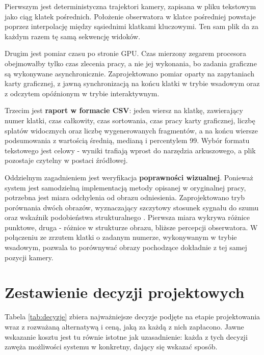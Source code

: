 Pierwszym jest deterministyczna trajektori kamery, zapisana w pliku tekstowym jako ciąg klatek pośrednich. Położenie obserwatora w klatce pośredniej powstaje poprzez interpolację między sąsiednimi klatkami kluczowymi. Ten sam plik da za każdym razem tę samą sekwencję widoków.

Drugim jest pomiar czasu po stronie GPU. Czas mierzony zegarem procesora obejmowałby tylko czas zlecenia pracy, a nie jej wykonania, bo zadania graficzne są wykonywane asynchronicznie. Zaprojektowano pomiar oparty na zapytaniach karty graficznej, z jawną synchronizacją na końcu klatki w trybie wsadowym oraz z odczytem opóźnionym w trybie interaktywnym.

Trzecim jest \textbf{raport w formacie CSV}: jeden wiersz na klatkę,
zawierający numer klatki, czas całkowity, czas sortowania, czas pracy karty
graficznej, liczbę splatów widocznych oraz liczbę wygenerowanych fragmentów,
a na końcu wiersze podsumowania z wartością średnią, medianą i percentylem
99. Wybór formatu tekstowego jest celowy  -  wyniki trafiają wprost do
narzędzia arkuszowego, a plik pozostaje czytelny w postaci źródłowej.
 
Oddzielnym zagadnieniem jest weryfikacja \textbf{poprawności wizualnej}.
Ponieważ system jest samodzielną implementacją metody opisanej w oryginalnej pracy, potrzebna jest miara odchylenia od obrazu odniesienia.
Zaprojektowano tryb porównania dwóch obrazów, wyznaczający szczytowy stosunek
sygnału do szumu  oraz wskaźnik podobieństwa
strukturalnego . Pierwsza miara wykrywa
różnice punktowe, druga  -  różnice w strukturze obrazu, bliższe percepcji
obserwatora. W połączeniu ze zrzutem klatki o zadanym numerze, wykonywanym
w trybie wsadowym, pozwala to porównywać obrazy pochodzące dokładnie z tej
samej pozycji kamery.
 
\section{Zestawienie decyzji projektowych}
\label{sec:decyzje}
 
Tabela \ref{tab:decyzje} zbiera najważniejsze decyzje podjęte na etapie
projektowania wraz z rozważaną alternatywą i ceną, jaką za każdą z nich
zapłacono. Jawne wskazanie kosztu jest tu równie istotne jak uzasadnienie:
każda z tych decyzji zawęża możliwości systemu w konkretny, dający się
wskazać sposób.
 
